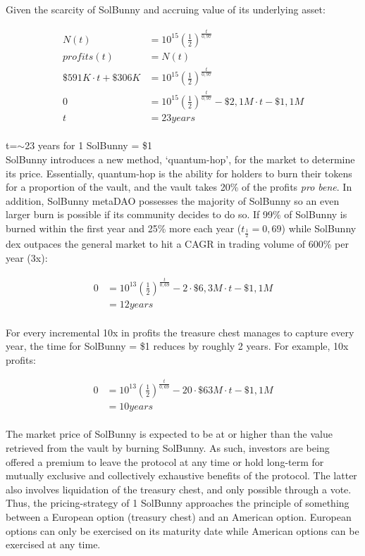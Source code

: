 \documentclass[12pt]{article}
\begin{document}
Given the scarcity of SolBunny and accruing value of its underlying asset:

\begin{equation}\label{target}
\begin{split}
N(t) &=10^{15}(\frac{1}{2})^\frac{t}{0,97}\\
profits(t) &=N(t)\\
\$591K \cdot t+ \$306K&=10^{15}(\frac{1}{2})^\frac{t}{0,97}\\
0 &=10^{15}(\frac{1}{2})^\frac{t}{0,97}-\$2,1M \cdot t-\$1,1M\\
t &= 23years
\end{split}
\end{equation}
\\

t=$\sim$23 years for 1 SolBunny = \$1\\
SolBunny introduces a new method, ‘quantum-hop’, for the market to determine its price. Essentially, quantum-hop is the ability for holders to burn their tokens for a proportion of the vault, and the vault takes 20\% of the profits \textit{pro bene}. In addition, SolBunny metaDAO possesses the majority of SolBunny so an even larger burn is possible if its community decides to do so. If 99\% of SolBunny is burned within the first year and 25\% more each year ($t_{\frac{1}{2}}=0,69$) while SolBunny dex outpaces the general market to hit a CAGR in trading volume of 600\% per year (3x):

\begin{equation}\label{2x}
\begin{split}
0 &=10^{13}(\frac{1}{2})^\frac{t}{0,69} - 2 \cdot \$6,3M \cdot t-\$1,1M\\
 &= 12years
\end{split}
\end{equation}
\\

For every incremental 10x in profits the treasure chest manages to capture every year, the time for SolBunny = \$1 reduces by roughly 2 years. For example, 10x profits:

\begin{equation}\label{10x}
\begin{split}
0 &=10^{13}(\frac{1}{2})^\frac{t}{0,69} - 20 \cdot \$63M \cdot t-\$1,1M\\
&= 10years
\end{split}
\end{equation}
\\
The market price of SolBunny is expected to be at or higher than the value retrieved from the vault by burning SolBunny. As such, investors are being offered a premium to leave the protocol at any time or hold long-term for mutually exclusive and collectively exhaustive benefits of the protocol. The latter also involves liquidation of the treasury chest, and only possible through a vote. Thus, the pricing-strategy of 1 SolBunny approaches the principle of something between a European option (treasury chest) and an American option. European options can only be exercised on its maturity date while American options can be exercised at any time.
\end{document}

